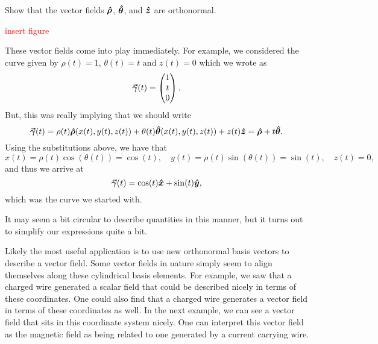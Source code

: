 \begin{exercise}
    Show that the vector fields $\boldsymbol{\hat{\rho}}$, $\boldsymbol{\hat{\theta}}$, and $\boldsymbol{\hat{z}}$ are orthonormal.
\end{exercise}

\textcolor{red}{insert figure}

These vector fields come into play immediately. For example, we considered the curve given by $\rho(t)=1$, $\theta(t)=t$ and $z(t)=0$ which we wrote as
\[
\boldsymbol{\vec{\gamma}}(t) = \begin{pmatrix} 1 \\ t \\ 0 \end{pmatrix}.
\]
But, this was really implying that we should write
\[
\boldsymbol{\vec{\gamma}}(t) = \rho(t)\boldsymbol{\hat{\rho}}(x(t),y(t),z(t)) + \theta(t)\boldsymbol{\hat{\theta}}(x(t),y(t),z(t))+z(t)\boldsymbol{\hat{z}} = \boldsymbol{\hat{\rho}} + t\boldsymbol{\hat{\theta}}.
\]
Using the substitutions above, we have that
\[
x(t) = \rho(t)\cos(\theta(t)) = \cos(t), \quad y(t) = \rho(t)\sin(\theta(t))=\sin(t), \quad z(t)=0,
\]
and thus we arrive at
\[
\boldsymbol{\vec{\gamma}}(t) = \cos(t)\boldsymbol{\hat{x}} + \sin(t)\boldsymbol{\hat{y}},
\]
which was the curve we started with.

\begin{remark}
It may seem a bit circular to describe quantities in this manner, but it turns out to simplify our expressions quite a bit.
\end{remark}



Likely the most useful application is to use new orthonormal basis vectors to describe a vector field.  Some vector fields in nature simply seem to align themselves along these cylindrical basis elements.  For example, we saw that a charged wire generated a scalar field that could be described nicely in terms of these coordinates.  One could also find that a charged wire generates a vector field in terms of these coordinates as well. In the next example, we can see a vector field that sits in this coordinate system nicely.  One can interpret this vector field as the magnetic field as being related to one generated by a current carrying wire.


